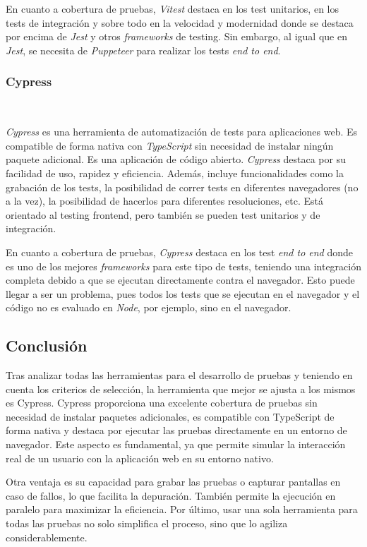 En cuanto a cobertura de pruebas, \textit{Vitest} destaca en los test unitarios, en los tests de integración y sobre todo en la velocidad y modernidad donde se destaca por encima de \textit{Jest} y otros \textit{frameworks} de testing. Sin embargo, al igual que en \textit{Jest}, se necesita de \textit{Puppeteer} para realizar los tests \textit{end to end}.

\subsubsection{Cypress}~\label{subsec:cypress}

\textit{Cypress} es una herramienta de automatización de tests para aplicaciones web. Es compatible de forma nativa con \textit{TypeScript} sin necesidad de instalar ningún paquete adicional. Es una aplicación de código abierto. \textit{Cypress} destaca por su facilidad de uso, rapidez y eficiencia. Además, incluye funcionalidades como la grabación de los tests, la posibilidad de correr tests en diferentes navegadores (no a la vez), la posibilidad de hacerlos para diferentes resoluciones, etc. Está orientado al testing frontend, pero también se pueden test unitarios y de integración.

En cuanto a cobertura de pruebas, \textit{Cypress} destaca en los test \textit{end to end} donde es uno de los mejores \textit{frameworks} para este tipo de tests, teniendo una integración completa debido a que se ejecutan directamente contra el navegador. Esto puede llegar a ser un problema, pues todos los tests que se ejecutan en el navegador y el código no es evaluado en \textit{Node}, por ejemplo, sino en el navegador.

\subsection{Conclusión}

Tras analizar todas las herramientas para el desarrollo de pruebas y teniendo en cuenta los criterios de selección, la herramienta que mejor se ajusta a los mismos es Cypress. Cypress proporciona una excelente cobertura de pruebas sin necesidad de instalar paquetes adicionales, es compatible con TypeScript de forma nativa y destaca por ejecutar las pruebas directamente en un entorno de navegador. Este aspecto es fundamental, ya que permite simular la interacción real de un usuario con la aplicación web en su entorno nativo.

Otra ventaja es su capacidad para grabar las pruebas o capturar pantallas en caso de fallos, lo que facilita la depuración. También permite la ejecución en paralelo para maximizar la eficiencia. Por último, usar una sola herramienta para todas las pruebas no solo simplifica el proceso, sino que lo agiliza considerablemente.

